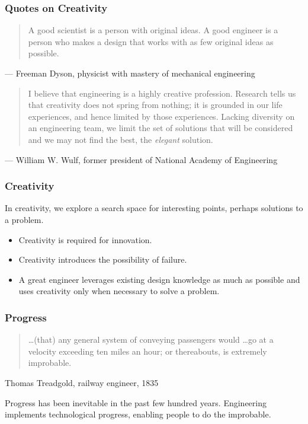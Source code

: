 \begin{frame}
\frametitle{Quotes on Creativity} 
\begin{quote}
A good scientist is a person with original ideas.  A good engineer is a person who makes a design that works with as few original ideas as possible.
\end{quote}
{\hfill \scriptsize --- Freeman Dyson, physicist with mastery of mechanical engineering}

\vspace{1cm}

\begin{quote}
I believe that engineering is a highly creative profession. Research tells 
us that creativity does not spring from nothing; it is grounded in our 
life experiences, and hence limited by those experiences. Lacking 
diversity on an engineering team, we limit the set of solutions that 
will be considered and we may not find the best, the \emph{elegant}
solution.
\end{quote}
{\hfill \scriptsize --- William W. Wulf, former president of National Academy of Engineering}
\end{frame}

\begin{frame}
\frametitle{Creativity} 
\begin{changemargin}{1cm}
In creativity, we explore a search space for interesting points, perhaps
solutions to a problem.\\[1em]
\begin{itemize}
\item Creativity is required for innovation.
\item Creativity introduces the possibility of failure.
\item A great engineer leverages existing design knowledge as
much as possible and uses creativity only when necessary to solve a problem.
\end{itemize}
\end{changemargin}

\end{frame}


\begin{frame}
\frametitle{Progress}
\begin{quote} 
\ldots (that) any general system of conveying passengers would \ldots go at a velocity exceeding ten miles an hour; or thereabouts, is extremely improbable.
\end{quote}
{\scriptsize \hfill Thomas Treadgold, railway engineer, 1835}

\vspace{1cm}

\begin{changemargin}{1cm}
Progress has been inevitable in the past few hundred years. Engineering
implements technological progress, enabling people to do the improbable.
\end{changemargin}

\end{frame}

